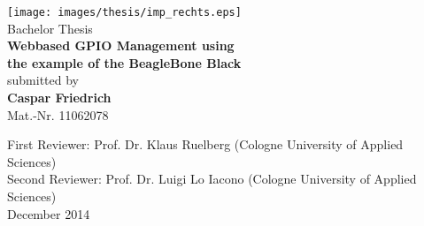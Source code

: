 \begin{otherlanguage}{english}

\begin{titlepage}
\begin{center}

\texttt{[image: images/thesis/imp\_rechts.eps]}\\[3cm]

Bachelor Thesis\\[0.5cm]
{\sffamily \bfseries \Huge Webbased GPIO Management using\\[0.25cm]
the example of the BeagleBone Black}\\[2cm]

submitted by\\[0.5cm]
\textbf{Caspar Friedrich}\\[0.5cm]
Mat.-Nr. 11062078\\[0.5cm]

\vfill

First Reviewer: Prof. Dr. Klaus Ruelberg (Cologne University of Applied Sciences)\\[0.5cm]
Second Reviewer: Prof. Dr. Luigi Lo Iacono (Cologne University of Applied Sciences)\\[0.5cm]
December 2014

\end{center}
\end{titlepage}

\end{otherlanguage}
